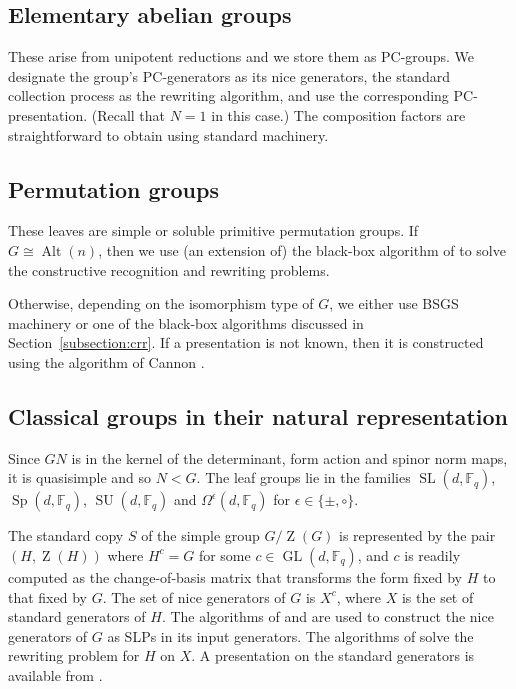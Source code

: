\documentclass[12pt,twoside,reqno,psamsfonts]{amsproc}
\numberwithin{equation}{section}
\numberwithin{figure}{section}
\newcounter{algorithm}
\theoremstyle{plain}
\theoremstyle{definition}
\theoremstyle{remark}
\providecommand{\Alt}[1]{\operatorname{Alt}( #1 )}
\newcommand{\field}[1]{\mathbb{#1}}
\newcommand{\F}{\field{F}}
\DeclareMathOperator{\GL}{GL}
\DeclareMathOperator{\SL}{SL}
\DeclareMathOperator{\Sp}{Sp}
\DeclareMathOperator{\SU}{SU}
\DeclareMathOperator{\Zent}{Z}
\begin{document}
\subsection{Elementary abelian groups}
These arise from unipotent reductions and we store them as PC-groups.
We designate the group's PC-generators as its nice generators,
the standard collection process as the rewriting algorithm,
and use the corresponding PC-presentation. 
(Recall that $N=1$ in this case.)
The composition factors are straightforward to obtain using 
standard machinery.

\subsection{Permutation groups}
These leaves are simple or soluble primitive permutation groups.  
If $G\cong \Alt{n}$, then we use (an extension of)
the black-box algorithm of \cite{MR1743388} to solve
the constructive recognition and rewriting problems.

Otherwise, depending on the isomorphism type of $G$,
we either use BSGS machinery or one of the 
black-box algorithms discussed in Section~\ref{subsection:crr}.  
If a presentation is not known, then it 
is constructed using the algorithm of Cannon \cite{Cannon73}.

\subsection{Classical groups in their natural representation}
\label{classical-gps}
Since $GN$ is in the kernel of the determinant, form action and spinor norm
maps, it is quasisimple and so $N < G$.
The leaf groups lie in the families $\SL(d, \F_q)$,
$\Sp(d, \F_q)$, $\SU(d, \F_q)$ and $\Omega^{\epsilon}(d, \F_q)$ 
for $\epsilon \in \{ \pm, \circ \}$. %

The standard copy $S$ of the simple group $G/\Zent(G)$ is represented by 
the pair $(H,\Zent(H))$ where $H^c = G$ for some $c \in \GL(d,\F_q)$,
and $c$ is readily computed as the change-of-basis matrix that
transforms the form fixed by $H$ to that fixed by $G$.
The set of nice generators of $G$ is $X^c$, where $X$ is the
set of standard generators of $H$.
The algorithms of \cite{cr-odd} and \cite{dlo}
are used to construct the nice generators of $G$ as SLPs in 
its input generators. 
The algorithms of \cite{costi_phd} solve the rewriting problem for $H$ on $X$.
A presentation on the standard generators is available from \cite{pres}.
\end{document}
